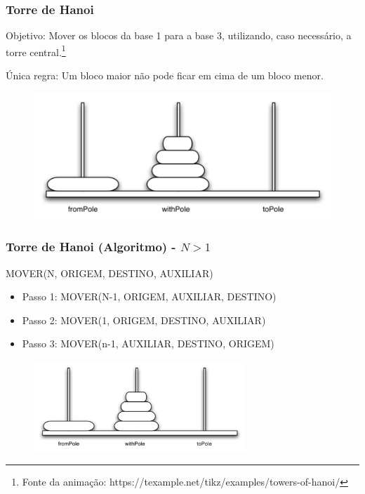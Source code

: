 \documentclass[10pt]{beamer}
\begin{document}
\begin{frame}[t]
  \frametitle{Torre de Hanoi}
  Objetivo: Mover os blocos da base 1 para a base 3, utilizando, caso necessário, a torre central.\footnote{Fonte da animação: https://texample.net/tikz/examples/towers-of-hanoi/}

  Única regra: Um bloco maior não pode ficar em cima de um bloco menor.
  \begin{figure}[h]
    \begin{center}
      \includegraphics[width=12cm]{./fig/hanoi.png}
    \end{center}
  \end{figure}
\end{frame}


\begin{frame}
  \frametitle{Torre de Hanoi (Algoritmo) - $N>1$}
  MOVER(N, ORIGEM, DESTINO, AUXILIAR)
  \begin{itemize}\itemsep1em 
    \item<2->Passo 1: MOVER(N-1, ORIGEM, AUXILIAR, DESTINO)
    \item<3->Passo 2: MOVER(1, ORIGEM, DESTINO, AUXILIAR)
    \item<4->Passo 3: MOVER(n-1, AUXILIAR, DESTINO, ORIGEM)
  \end{itemize}

  \vfill
  \begin{figure}[h]
    \begin{center}
      \includegraphics[width=8cm]{./fig/hanoi.png}
    \end{center}
  \end{figure}
  
\end{frame}
\end{document}
